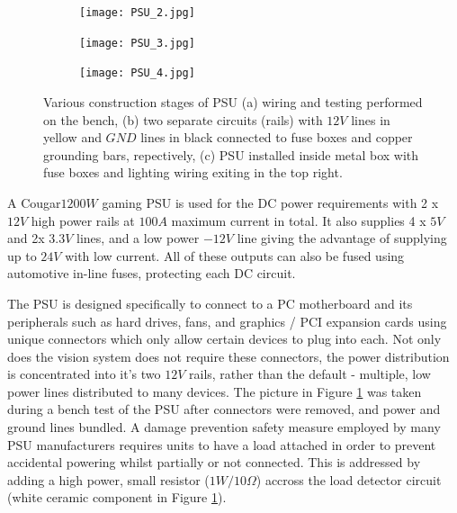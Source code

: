 \documentclass[fleqn,twoside]{article}
\begin{document}
\begin{figure}[h]
	\centering
	\begin{subfigure}{.4\textwidth}
		\centering
		\texttt{[image: PSU\_2.jpg]}
		\caption{}
		\label{fig:PSU_2}
	\end{subfigure}%
	\begin{subfigure}{.4\textwidth}
		\centering
		\texttt{[image: PSU\_3.jpg]}
		\caption{}
		\label{fig:PSU_3}
	\end{subfigure}%

	\begin{subfigure}{0.8\textwidth}
		\centering
		\texttt{[image: PSU\_4.jpg]}
		\caption{}
		\label{fig:PSU_4}
	\end{subfigure}%

	\caption{Various construction stages of PSU (a) wiring and testing performed on the bench, (b) two separate circuits (rails) with $12V$ lines in yellow and $GND$ lines in black connected to fuse boxes and copper grounding bars, repectively, (c) PSU installed inside metal box with fuse boxes and lighting wiring exiting in the top right.}
	\label{}
\end{figure}


A Cougar\texttrademark $1200W$ gaming PSU is used for the DC power requirements with 2 x $12V$ high power rails at $100A$ maximum current in total. It also supplies 4 x $5V$ and 2x $3.3V$ lines, and a low power $-12V$ line giving the advantage of supplying up to $24V$ with low current. All of these outputs can also be fused using automotive in-line fuses, protecting each DC circuit. 


The PSU is designed specifically to connect to a PC motherboard and its peripherals such as hard drives, fans, and graphics / PCI expansion cards using unique connectors which only allow certain devices to plug into each. Not only does the vision system does not require these connectors, the power distribution is concentrated into it's two $12V$ rails, rather than the default - multiple, low power lines distributed to many devices. The picture in Figure \ref{fig:PSU_2} was taken during a bench test of the PSU after connectors were removed, and power and ground lines bundled. A damage prevention safety measure employed by many PSU manufacturers requires units to have a load attached in order to prevent accidental powering whilst partially or not connected. This is addressed by adding a high power, small resistor ($1W/10\Omega$) accross the load detector circuit (white ceramic component in Figure \ref{fig:PSU_2}).  
\end{document}
